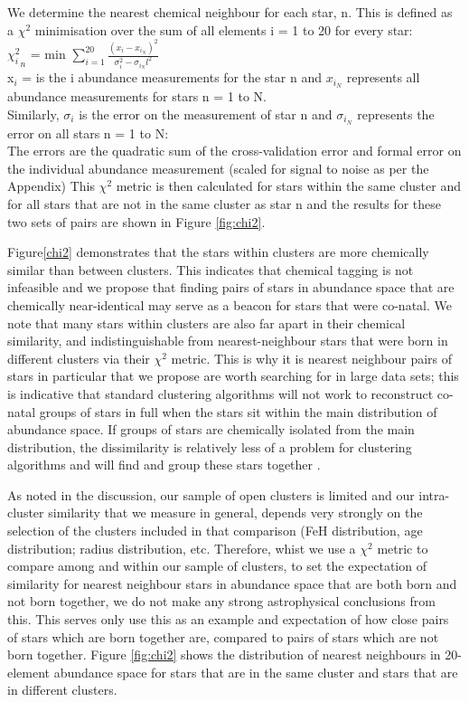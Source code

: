 \documentclass[14pt, preprint2]{aastex6}
\begin{document}
We determine the nearest chemical neighbour for each star, n. This is defined as a $\chi^2$ minimisation over the sum of all elements i = 1 to 20 for every star: \\

${\chi_i^2}_n$ = min $ \sum_{i=1}^{20}  \frac{(x_i - x_{i_N})^2}{\sigma_i^2 - \sigma_{i_N}l^2}$  \\

x$_i$ = is the i abundance measurements for the star n and  $x_{i_N}$ represents all abundance measurements for stars n = 1 to N. \\
Similarly, $\sigma_i$ is the error on the measurement of star n and $\sigma_{i_N}$ represents the error on all stars n = 1 to N: \\
The errors are the quadratic sum of the cross-validation error and formal error on the individual abundance measurement (scaled for signal to noise as per the Appendix) 
This $\chi^2$ metric is then calculated for stars within the same cluster and for all stars that are not in the same cluster as star n and the results for these two sets of pairs are shown in Figure \ref{fig:chi2}. 

Figure\ref{chi2} demonstrates that the stars within clusters are more chemically similar than between clusters. This indicates that chemical tagging is not infeasible and we propose that finding pairs of stars in abundance space that are chemically near-identical may serve as a beacon for stars that were co-natal.  We note that many stars within clusters are also far apart in their chemical similarity, and indistinguishable from nearest-neighbour stars that were born in different clusters via their $\chi^2$ metric. This is why it is nearest neighbour pairs of stars in particular that we propose are worth searching for in large data sets; this is indicative that standard clustering algorithms will not work to reconstruct co-natal groups of stars in full when the stars sit within the main distribution of abundance space. If groups of stars are chemically isolated from the main distribution, the dissimilarity is relatively less of a problem for clustering algorithms and will find and group these stars together \citep[see][for success of chemical tagging of targeted metal-poor globular clusters]{Hogg2016}.

As noted in the discussion,  our sample of open clusters is limited and our intra-cluster similarity that we measure in general, depends very strongly on the selection of the clusters included in that comparison (FeH distribution, age distribution; radius distribution, etc. Therefore, whist we use a $\chi^2$ metric to compare among and within our sample of clusters, to set the expectation of similarity for nearest neighbour stars in abundance space that are both born and not born together, we do not make any  strong astrophysical conclusions from this. This serves only use this as an example and expectation of how close pairs of stars which are born together are, compared to pairs of stars which are not born together.  Figure \ref{fig:chi2} shows the distribution of nearest neighbours in 20-element abundance space for stars that are in the same cluster and stars that are in different clusters. 
\end{document}

